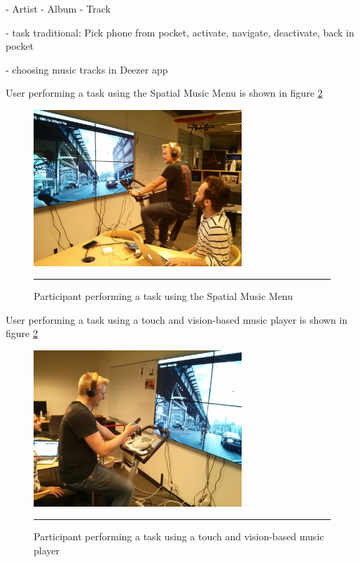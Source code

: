 
- Artist - Album - Track

- task traditional: Pick phone from pocket, activate, navigate, deactivate, back in pocket

- choosing music tracks in Deezer app

User performing a task using the Spatial Music Menu is shown in figure \ref{fig:evalspatial}

\begin{figure}[t]
	\centering
		\includegraphics[width=0.7\textwidth,height=\textheight,keepaspectratio]{./Figures/evaluation_spatial.jpg}
		\rule{35em}{1pt}
	\caption[Evaluation Spatial Music Menu]{Participant performing a task using the Spatial Music Menu}
	\label{fig:evalspatial}
\end{figure}

User performing a task using a touch and vision-based music player is shown in figure \ref{fig:evalspatial}

\begin{figure}[t]
	\centering
		\includegraphics[width=0.7\textwidth,height=\textheight,keepaspectratio]{./Figures/evaluation_normal.jpg}
		\rule{35em}{1pt}
	\caption[Evaluation touch and vision-based interface]{Participant performing a task using a touch and vision-based music player}
	\label{fig:evalspatial}
\end{figure}

